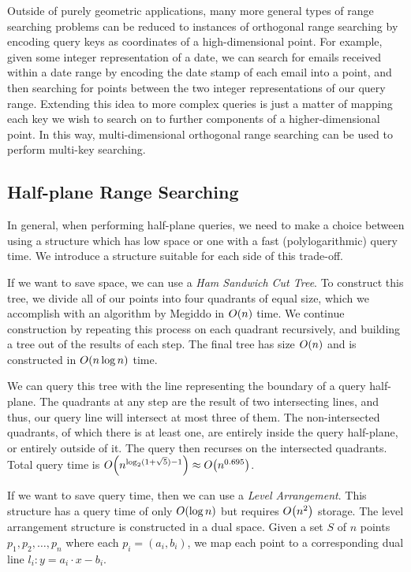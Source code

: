 Outside of purely geometric applications, many more general types of range searching problems can be reduced to instances of orthogonal range searching by encoding query keys as coordinates of a high-dimensional point.
For example, given some integer representation of a date, we can search for emails received within a date range by encoding the date stamp of each email into a point, and then searching for points between the two integer representations of our query range.
Extending this idea to more complex queries is just a matter of mapping each key we wish to search on to further components of a higher-dimensional point.  
In this way, multi-dimensional orthogonal range searching can be used to perform multi-key searching.\cite{Willard96} 


\subsection*{Half-plane Range Searching}

In general, when performing half-plane queries, we need to make a choice between using a structure which has low space or one with a fast (polylogarithmic) query time.
We introduce a structure suitable for each side of this trade-off.

If we want to save space, we can use a \emph{Ham Sandwich Cut Tree}\cite{Edelsbrunner86, Edelsbrunner87}.
To construct this tree, we divide all of our points into four quadrants of equal size, which we accomplish with an algorithm by Megiddo\cite{Megiddo85} in $O\!\left(n\right)$ time.
We continue construction by repeating this process on each quadrant recursively, and building a tree out of the results of each step.
The final tree has size $O\!\left(n\right)$ and is constructed in $O\!\left(n\log{n}\right)$ time.

We can query this tree with the line representing the boundary of a query half-plane.
The quadrants at any step are the result of two intersecting lines, and thus, our query line will intersect at most three of them.
The non-intersected quadrants, of which there is at least one, are entirely inside the query half-plane, or entirely outside of it.
The query then recurses on the intersected quadrants.
Total query time is $O\!\left(n^{\log_2(1 + \sqrt{5}) - 1}\right) \approx O\!\left(n^{0.695}\right)$.


If we want to save query time, then we can use a \emph{Level Arrangement}\cite{GoswamiDN04}.  
This structure has a query time of only $O\!\left(\log{n}\right)$ but requires $O\!\left(n^2\right)$ storage.
The level arrangement structure is constructed in a dual space.
Given a set $S$ of $n$ points $p_1, p_2, \ldots, p_n$ where each $p_i = (a_i, b_i)$, we map each point to a corresponding dual line $l_i: y = a_i \cdot x - b_i$.

